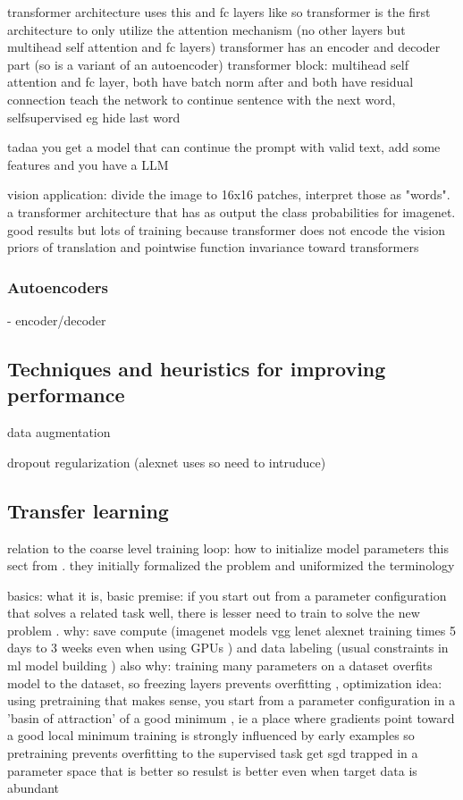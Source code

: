 \documentclass{article}
\begin{document}
transformer architecture uses this and fc layers like so
transformer is the first architecture to only utilize the attention mechanism (no other layers but multihead self attention and fc layers)
transformer has an encoder and decoder part (so is a variant of an autoencoder)
transformer block: multihead self attention and fc layer, both have batch norm after and both have residual connection
teach the network to continue sentence with the next word, selfsupervised eg hide last word

tadaa you get a model that can continue the prompt with valid text, add some features and you have a LLM

vision application: divide the image to 16x16 patches, interpret those as "words". a transformer architecture that has as output the class probabilities for imagenet. good results but lots of training because transformer does not encode the vision priors of translation and pointwise function invariance toward transformers

\subsubsection{Autoencoders}

- encoder/decoder

\subsection{Techniques and heuristics for improving performance}

data augmentation

dropout regularization (alexnet uses so need to intruduce)

\subsection{Transfer learning}

relation to the coarse level training loop: how to initialize model parameters
this sect from \cite{transferlearning_survey}. they initially formalized the problem and uniformized 
the terminology

basics: what it is, basic premise: if you start out from a parameter configuration that solves a related 
task well, there is lesser need to train to solve the new problem \cite{transferlearning_survey}.
why: save compute (imagenet models vgg lenet alexnet training times 5 days to 3 weeks even when using GPUs \cite{vgg}) and data labeling (usual constraints in ml model building \cite{engbook})
also why: training many parameters on a dataset overfits model to the dataset, so freezing layers prevents overfitting \cite{googlelenet},
optimization idea: using pretraining that makes sense, you start from a parameter configuration in a 'basin of attraction'
of a good minimum \cite{erhanWhyDoesUnsupervised2010}, ie a place where gradients point toward a good local minimum
    training is strongly influenced by early examples so pretraining prevents overfitting to the supervised task 
    get sgd trapped in a parameter space that is better so resulst is better even when target data is abundant \cite{erhanWhyDoesUnsupervised2010}    
\end{document}
